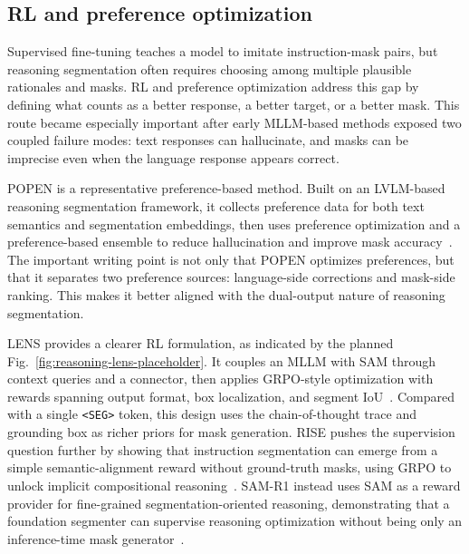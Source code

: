 \subsection{RL and preference optimization}

Supervised fine-tuning teaches a model to imitate instruction-mask pairs, but reasoning segmentation often requires choosing among multiple plausible rationales and masks. RL and preference optimization address this gap by defining what counts as a better response, a better target, or a better mask. This route became especially important after early MLLM-based methods exposed two coupled failure modes: text responses can hallucinate, and masks can be imprecise even when the language response appears correct.



POPEN is a representative preference-based method. Built on an LVLM-based reasoning segmentation framework, it collects preference data for both text semantics and segmentation embeddings, then uses preference optimization and a preference-based ensemble to reduce hallucination and improve mask accuracy~\citep{zhuPopenPreferencebasedOptimization2025}. The important writing point is not only that POPEN optimizes preferences, but that it separates two preference sources: language-side corrections and mask-side ranking. This makes it better aligned with the dual-output nature of reasoning segmentation.



LENS provides a clearer RL formulation, as indicated by the planned Fig.~\ref{fig:reasoning-lens-placeholder}. It couples an MLLM with SAM through context queries and a connector, then applies GRPO-style optimization with rewards spanning output format, box localization, and segment IoU~\citep{zhuLensLearningSegment2026}. Compared with a single \texttt{<SEG>} token, this design uses the chain-of-thought trace and grounding box as richer priors for mask generation. RISE pushes the supervision question further by showing that instruction segmentation can emerge from a simple semantic-alignment reward without ground-truth masks, using GRPO to unlock implicit compositional reasoning~\citep{zhouReasoningImplicitSelfsupervised2026}. SAM-R1 instead uses SAM as a reward provider for fine-grained segmentation-oriented reasoning, demonstrating that a foundation segmenter can supervise reasoning optimization without being only an inference-time mask generator~\citep{huangSamr1LeveragingSam2026}.

